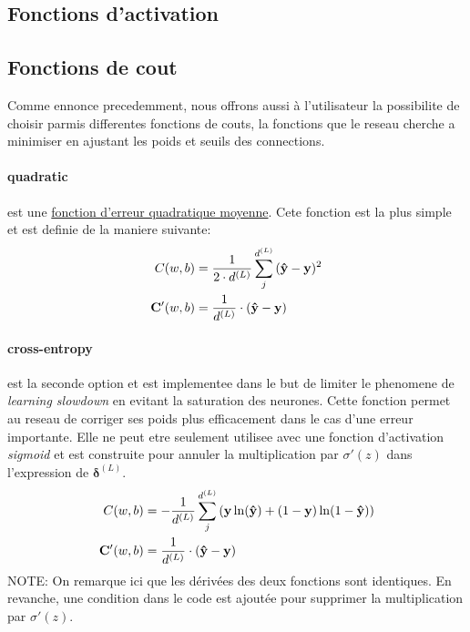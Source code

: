 \documentclass[11pt]{article}
\begin{document}
\subsection{Fonctions d'activation}



\subsection{Fonctions de cout}\label{cost}
Comme ennonce precedemment, nous offrons aussi \`a l'utilisateur la possibilite
de choisir parmis differentes fonctions de couts, la fonctions que le reseau
cherche a minimiser en ajustant les poids et seuils des connections.
\paragraph{quadratic} est une
\href{https://fr.wikipedia.org/wiki/Erreur_quadratique_moyenne}
{fonction d'erreur quadratique moyenne}. Cete fonction est la plus simple et
est definie de la maniere suivante:
\begin{equation}
	\begin{aligned}
		C(w, b) &= \frac{1}{2\cdot d^{(L)}}\sum_{j}^{d^{(L)}}{({\bf\hat y} - {\bf y})^2}  \\
		{\bf C'}(w, b) &= \frac{1}{d^{(L)}}\cdot({\bf\hat y} - {\bf y})
	\end{aligned}
\end{equation}
\paragraph{cross-entropy} est la seconde option et est implementee dans le but
de limiter le phenomene de \emph{learning slowdown} en evitant la saturation des
neurones. Cette fonction permet au reseau de corriger ses poids plus efficacement
dans le cas d'une erreur importante. Elle ne peut etre seulement utilisee
avec une fonction d'activation \emph{sigmoid} et est construite pour annuler la
multiplication par $\sigma'(z)$ dans l'expression de $\boldsymbol\delta^{(L)}$.
\begin{equation}
	\begin{aligned}
		C(w, b) &= -\frac{1}{d^{(L)}}\sum_{j}^{d^{(L)}}{\left({\bf y}\ln({\bf\hat y}) +
		(1-{\bf y})\ln(1- {\bf \hat y})\right)}  \\
		{\bf C'}(w, b) &= \frac{1}{d^{(L)}}\cdot({\bf\hat y} - {\bf y})
	\end{aligned}
\end{equation}
NOTE: On remarque ici que les d\'eriv\'ees des deux fonctions sont identiques. En
revanche, une condition dans le code est ajout\'ee pour supprimer la multiplication
par $\sigma'(z)$.
\end{document}
